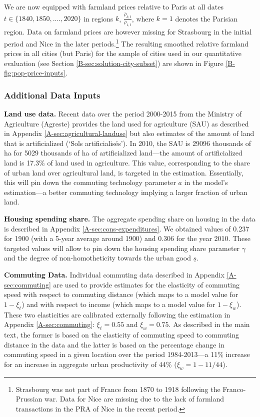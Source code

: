 \documentclass[11pt]{report}
\begin{document}
We are now equipped with farmland prices relative to Paris at all dates $t \in \{1840, 1850, ...., 2020\}$ in regions $k$, $\frac{\bar{\rho}_{k,t}}{\bar{\rho}_{1,t}}$, where $k=1$ denotes the Parisian region. Data on farmland prices are however missing for Strasbourg in the initial period and Nice in the later periods.\footnote{Strasbourg was not part of France from 1870 to 1918 following the Franco-Prussian war. Data for Nice are missing due to the lack of farmland transactions in the PRA of Nice in the recent period.} The resulting smoothed relative farmland prices in all cities (but Paris) for the sample of cities used in our quantitative evaluation  (see Section \ref{B-sec:solution-city-subset})  are shown in Figure \ref{B-fig:pop-price-inputs}.


\subsubsection{Additional Data Inputs}

\textbf{Land use data.} Recent data over the period 2000-2015 from the Ministry of Agriculture (Agreste) provides the land used for agriculture (SAU) as described in Appendix \ref{A-sec:agricultural-landuse} but also estimates of the amount of land that is artificialized (`Sols artificialisés'). In 2010, the SAU is 29096 thousands of ha for 5029 thousands of ha of artificialized land---the amount of artificialized land is 17.3\% of land used in agriculture. This value, corresponding to the share of urban land over agricultural land, is targeted in the estimation. Essentially, this will pin down the commuting technology parameter $a$ in the model's estimation---a better commuting technology implying a larger fraction of urban land.

\textbf{Housing spending share.} The aggregate spending share on housing in the data is described in Appendix \ref{A-sec:cons-expenditures}. We obtained values of 0.237 for 1900 (with a 5-year average around 1900) and 0.306 for the year 2010. These targeted values will allow to pin down the housing spending share parameter $\gamma$ and the degree of non-homotheticity towards the urban good $\underline{s}$.

\textbf{Commuting Data.} Individual commuting data described in Appendix \ref{A-sec:commuting} are used to provide estimates for the elasticity of commuting speed with respect to commuting distance (which maps to a model value for $1-\xi_\ell$) and with respect to income (which maps to a model value for $1-\xi_w$). These two elasticities are calibrated externally following the estimation in Appendix \ref{A-sec:commuting}:  $\xi_\ell=0.55$ and $\xi_w=0.75$. As described in the main text, the former is based on the elasticity of commuting speed to commuting distance in the data and the latter is based on the percentage change in commuting speed in a given location over the period 1984-2013---a 11\% increase for an increase in aggregate urban productivity of 44\% ($\xi_w=1-11/44$).
\end{document}
